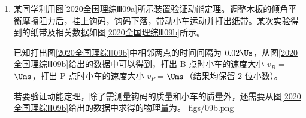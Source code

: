 \documentclass[\gkver]{gaokaozhenti}
\begin{document}
\begin{enumerate}
{故选 BC。
}

\item
某同学利用图\ref{2020全国理综Ⅲ09a}所示装置验证动能定理。调整木板的倾角平衡摩擦阻力后，挂上钩码，钩码下落，带动小车运动并打出纸带。某次实验得到的纸带及相关数据如图\ref{2020全国理综Ⅲ09b}所示。

已知打出图\ref{2020全国理综Ⅲ09b}中相邻两点的时间间隔为 $0.02\Us$，从图\ref{2020全国理综Ⅲ09b}给出的数据中可以得到，打出 B 点时小车的速度大小 $v_{B}=$$\Ums$，打出 P 点时小车的速度大小 $v_{P}=$$\Ums$（结果均保留 2 位小数）。

若要验证动能定理，除了需测量钩码的质量和小车的质量外，还需要从图\ref{2020全国理综Ⅲ09b}给出的数据中求得的物理量为。
{figs/09b.png}


\end{enumerate}
\end{document}

